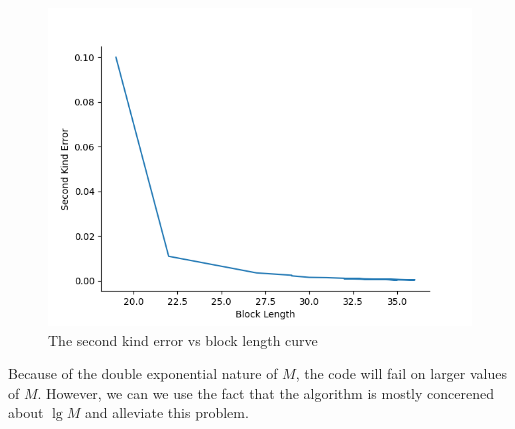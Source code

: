 \documentclass{article}
\begin{document}
\begin{figure}
	\includegraphics*[height = 0.4 \textheight]{ErrorVsBlocklength.png}
	\caption{The second kind error vs block length curve}
\end{figure}

Because of the double exponential nature of \(M\), the code will fail on larger values of \(M\). However, we can we use the fact that the algorithm is mostly concerened about \(\lg M\) and alleviate this problem.

\end{document}
